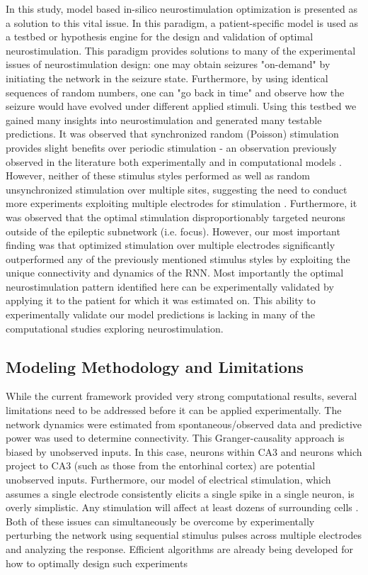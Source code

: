 \documentclass[journal,twoside,web]{ieeecolor}
\begin{document}
In this study, model based in-silico neurostimulation optimization is presented as a solution to this vital issue.
In this paradigm, a patient-specific model is used as a testbed or hypothesis engine for the design and validation of optimal neurostimulation.
This paradigm provides solutions to many of the experimental issues of neurostimulation design: one may obtain seizures "on-demand" by initiating the network in the seizure state.
Furthermore, by using identical sequences of random numbers, one can "go back in time" and observe how the seizure would have evolved under different applied stimuli.
Using this testbed we gained many insights into neurostimulation and generated many testable predictions.
It was observed that synchronized random (Poisson) stimulation provides slight benefits over periodic stimulation - an observation previously observed in the literature both experimentally and in computational models \cite{wyckhuys10,buffel14}.
However, neither of these stimulus styles performed as well as random unsynchronized stimulation over multiple sites, suggesting the need to conduct more experiments exploiting multiple electrodes for stimulation \cite{cook13,van14}.
Furthermore, it was observed that the optimal stimulation disproportionably targeted neurons outside of the epileptic subnetwork (i.e. focus).
However, our most important finding was that optimized stimulation over multiple electrodes significantly outperformed any of the previously mentioned stimulus styles by exploiting the unique connectivity and dynamics of the RNN.
Most importantly the optimal neurostimulation pattern identified here can be experimentally validated by applying it to the patient for which it was estimated on.
This ability to experimentally validate our model predictions is lacking in many of the computational studies exploring neurostimulation.

\subsection{Modeling Methodology and Limitations}

While the current framework provided very strong computational results, several limitations need to be addressed before it can be applied experimentally.
The network dynamics were estimated from spontaneous/observed data and predictive power was used to determine connectivity.
This Granger-causality approach is biased by unobserved inputs.
In this case, neurons within CA3 and neurons which project to CA3 (such as those from the entorhinal cortex) are potential unobserved inputs.
Furthermore, our model of electrical stimulation, which assumes a single electrode consistently elicits a single spike in a single neuron, is overly simplistic.
Any stimulation will affect at least dozens of surrounding cells \cite{grill05,desai14}. 
Both of these issues can simultaneously be overcome by experimentally perturbing the network using sequential stimulus pulses across multiple electrodes and analyzing the response.
Efficient algorithms are already being developed for how to optimally design such experiments \cite{lepage13,kim14}
\end{document}
